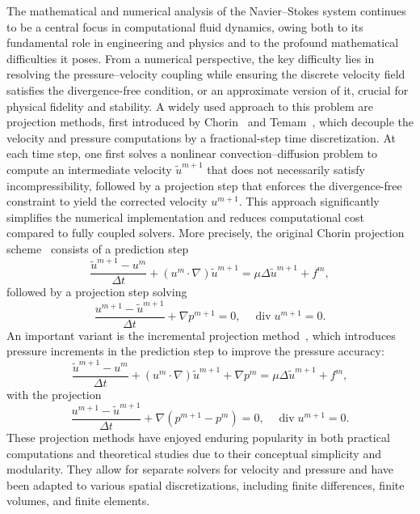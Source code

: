 \documentclass[10pt,letterpaper]{amsart}
\newcommand{\tu}{\widetilde{u}}
\newcommand{\Div}{\operatorname{div}}
\theoremstyle{definition}{\newtheorem{definition}[lemma]{Definition}}
\numberwithin{equation}{section}
\begin{document}
The mathematical and numerical analysis of the Navier–Stokes system continues to be a central focus in computational fluid dynamics, owing both to its fundamental role in engineering and physics and to the profound mathematical difficulties it poses.
	From a numerical perspective, the key difficulty lies in resolving the pressure–velocity coupling while ensuring the discrete velocity field satisfies the divergence-free condition, or an approximate version of it, crucial for physical fidelity and stability.
	A widely used approach to this problem are projection methods, first introduced by Chorin~\cite{Chorin1967,Chorin1968} and Temam~\cite{Temam1969}, which decouple the velocity and pressure computations by a fractional-step time discretization. At each time step, one first solves a nonlinear convection–diffusion problem to compute an intermediate velocity $\tu^{m+1}$ that does not necessarily satisfy incompressibility, followed by a projection step that enforces the divergence-free constraint to yield the corrected velocity $u^{m+1}$. This approach significantly simplifies the numerical implementation and reduces computational cost compared to fully coupled solvers.
	More precisely, the original Chorin projection scheme~\cite{Chorin1967,Chorin1968} consists of a prediction step
	\begin{equation}
			\label{eq:chorinprediction}
		\frac{\tu^{m+1}-u^m}{\Delta t}+(u^m\cdot \nabla)\tu^{m+1} = \mu \Delta \tu^{m+1} + f^m,
	\end{equation}
		followed by a projection step solving
	\begin{equation}
			\label{eq:projectioncontinuous1}
		\frac{u^{m+1}-\tu^{m+1}}{\Delta t}+\nabla p^{m+1} = 0,\quad
		\Div u^{m+1} = 0.
	\end{equation}
	An important variant is the incremental projection method~\cite{Goda1979,vanKan1986,Guermond1996,Shen1996}, which introduces pressure increments in the prediction step to improve the pressure accuracy:
		\begin{equation}
			\label{eq:incrementalprediction}
		\frac{\tu^{m+1}-u^m}{\Delta t}+(u^m\cdot \nabla)\tu^{m+1} +\nabla p^m = \mu \Delta \tu^{m+1} + f^m,
		\end{equation}
			with the projection
	\begin{equation}
			\label{eq:projectioncontinuous2}
		\frac{u^{m+1}-\tu^{m+1}}{\Delta t}+\nabla (p^{m+1} - p^m) = 0,\quad
	\Div u^{m+1} = 0.
	\end{equation}
	These projection methods have enjoyed enduring popularity in both practical computations and theoretical studies due to their conceptual simplicity and modularity. They allow for separate solvers for velocity and pressure and have been adapted to various spatial discretizations, including finite differences, finite volumes, and finite elements.
	
\end{document}
